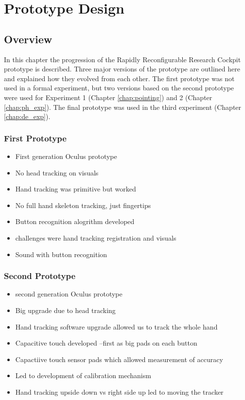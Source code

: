 \chapter{Prototype Design}
\label{chap:prototype}

\section{Overview}

In this chapter the progression of the Rapidly Reconfigurable Research Cockpit prototype is described.
Three major versions of the prototype are outlined here and explained how they evolved from each other.
The first prototype was not used in a formal experiment, but two versions based on the second prototype were used for Experiment 1 (Chapter \ref{chap:pointing}) and 2 (Chapter \ref{chap:ph_exp}).
The final prototype was used in the third experiment (Chapter \ref{chap:de_exp}).

\subsection{First Prototype}

\begin{itemize}
    \item First generation Oculus prototype
    \item No head tracking on visuals
    \item Hand tracking was primitive but worked
    \item No full hand skeleton tracking, just fingertips
    \item Button recognition alogrithm developed
    \item challenges were hand tracking registration and visuals
    \item Sound with button recognition
\end{itemize}

\subsection{Second Prototype}

\begin{itemize}
    \item second generation Oculus prototype
    \item Big upgrade due to head tracking
    \item Hand tracking software upgrade allowed us to track the whole hand
    \item Capacitive touch developed --first as big pads on each button
    \item Capactiive touch sensor pads which allowed measurement of accuracy
    \item Led to development of calibration mechanism
    \item Hand tracking upside down vs right side up led to moving the tracker
\end{itemize}


